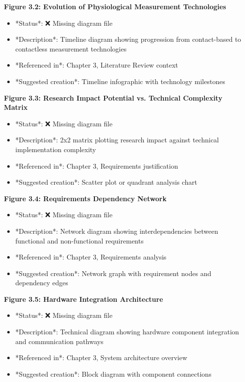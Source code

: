 \documentclass[11pt,a4paper]{article}
\begin{document}
{{\begin{itemize}
\end{itemize}
\textbf{Figure 3.2: Evolution of Physiological Measurement Technologies}

\begin{itemize}
\item *Status*: ❌ Missing diagram file
\item *Description*: Timeline diagram showing progression from contact-based to contactless measurement technologies
\item *Referenced in*: Chapter 3, Literature Review context
\item *Suggested creation*: Timeline infographic with technology milestones

\end{itemize}
\textbf{Figure 3.3: Research Impact Potential vs. Technical Complexity Matrix}

\begin{itemize}
\item *Status*: ❌ Missing diagram file
\item *Description*: 2x2 matrix plotting research impact against technical implementation complexity
\item *Referenced in*: Chapter 3, Requirements justification
\item *Suggested creation*: Scatter plot or quadrant analysis chart

\end{itemize}
\textbf{Figure 3.4: Requirements Dependency Network}

\begin{itemize}
\item *Status*: ❌ Missing diagram file
\item *Description*: Network diagram showing interdependencies between functional and non-functional requirements
\item *Referenced in*: Chapter 3, Requirements analysis
\item *Suggested creation*: Network graph with requirement nodes and dependency edges

\end{itemize}
\textbf{Figure 3.5: Hardware Integration Architecture}

\begin{itemize}
\item *Status*: ❌ Missing diagram file
\item *Description*: Technical diagram showing hardware component integration and communication pathways
\item *Referenced in*: Chapter 3, System architecture overview
\item *Suggested creation*: Block diagram with component connections


\end{itemize}}}
\end{document}

